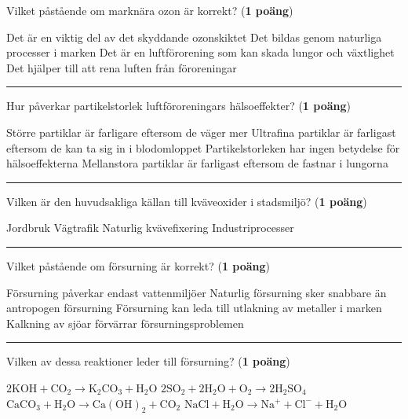 \documentclass{exam}
\begin{document}
\begin{questions}
\break
\vspace{5mm} 
\question Vilket påstående om marknära ozon är korrekt? (\textbf{1 poäng})
\begin{checkboxes}
    \choice Det är en viktig del av det skyddande ozonskiktet
    \choice Det bildas genom naturliga processer i marken
    \CorrectChoice Det är en luftförorening som kan skada lungor och växtlighet
    \choice Det hjälper till att rena luften från föroreningar
\end{checkboxes}

\vspace{5mm} 
\hrule 
\vspace{5mm} 

\question Hur påverkar partikelstorlek luftföroreningars hälsoeffekter? (\textbf{1 poäng})
\begin{checkboxes}
    \choice Större partiklar är farligare eftersom de väger mer
    \CorrectChoice Ultrafina partiklar är farligast eftersom de kan ta sig in i blodomloppet
    \choice Partikelstorleken har ingen betydelse för hälsoeffekterna
    \choice Mellanstora partiklar är farligast eftersom de fastnar i lungorna
\end{checkboxes}

\vspace{5mm} 
\hrule 
\vspace{5mm} 

\question Vilken är den huvudsakliga källan till kväveoxider i stadsmiljö? (\textbf{1 poäng})
\begin{checkboxes}
    \choice Jordbruk
    \CorrectChoice Vägtrafik
    \choice Naturlig kvävefixering
    \choice Industriprocesser
\end{checkboxes}

\vspace{5mm} 
\hrule 
\vspace{5mm} 

\question Vilket påstående om försurning är korrekt? (\textbf{1 poäng})
\begin{checkboxes}
    \choice Försurning påverkar endast vattenmiljöer
    \choice Naturlig försurning sker snabbare än antropogen försurning
    \CorrectChoice Försurning kan leda till utlakning av metaller i marken
    \choice Kalkning av sjöar förvärrar försurningsproblemen
\end{checkboxes}

\vspace{5mm} 
\hrule 
\vspace{5mm} 

\question Vilken av dessa reaktioner leder till försurning? (\textbf{1 poäng})
\begin{checkboxes}
    \choice $\mathrm{2KOH + CO_2 \rightarrow K_2CO_3 + H_2O}$
    \CorrectChoice $\mathrm{2SO_2 + 2H_2O + O_2 \rightarrow 2H_2SO_4}$
    \choice $\mathrm{CaCO_3 + H_2O \rightarrow Ca(OH)_2 + CO_2}$
    \choice $\mathrm{NaCl + H_2O \rightarrow Na^+ + Cl^- + H_2O}$
\end{checkboxes}


\end{questions}
\end{document}
